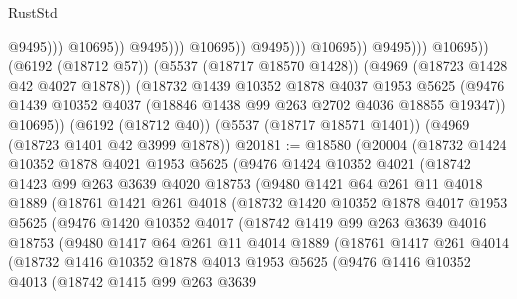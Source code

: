 \begin{lexlean}{RustStd}
\begin{coremodule}
                                              @9495)))
                                        @10695))
                                    @9495)))
                              @10695))
                          @9495)))
                    @10695))
                @9495)))
          @10695))
      (@6192 (@18712 @57))
      (@5537 (@18717 @18570 @1428))
      (@4969 (@18723 @1428 @42 @4027 @1878))
      (@18732
        @1439
        @10352
        @1878
        @4037
        @1953
        @5625
        (@9476 @1439 @10352 @4037 (@18846 @1438 @99 @263 @2702 @4036 @18855 @19347))
        @10695))
    (@6192 (@18712 @40))
    (@5537 (@18717 @18571 @1401))
    (@4969 (@18723 @1401 @42 @3999 @1878))
@20181 := @18580
    (@20004
      (@18732
        @1424
        @10352
        @1878
        @4021
        @1953
        @5625
        (@9476
          @1424
          @10352
          @4021
          (@18742
            @1423
            @99
            @263
            @3639
            @4020
            @18753
            (@9480
              @1421
              @64
              @261
              @11
              @4018
              @1889
              (@18761
                @1421
                @261
                @4018
                (@18732
                  @1420
                  @10352
                  @1878
                  @4017
                  @1953
                  @5625
                  (@9476
                    @1420
                    @10352
                    @4017
                    (@18742
                      @1419
                      @99
                      @263
                      @3639
                      @4016
                      @18753
                      (@9480
                        @1417
                        @64
                        @261
                        @11
                        @4014
                        @1889
                        (@18761
                          @1417
                          @261
                          @4014
                          (@18732
                            @1416
                            @10352
                            @1878
                            @4013
                            @1953
                            @5625
                            (@9476
                              @1416
                              @10352
                              @4013
                              (@18742
                                @1415
                                @99
                                @263
                                @3639

\end{coremodule}
\end{lexlean}
